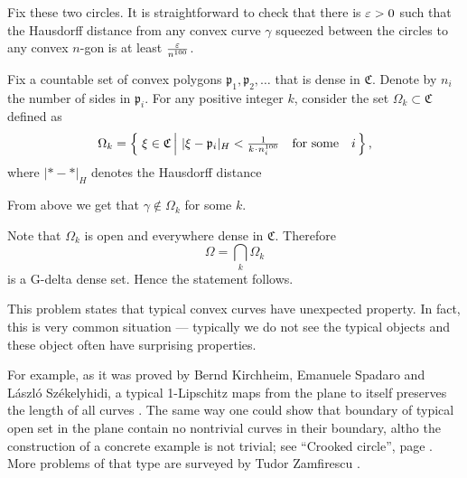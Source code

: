 Fix these two circles.
It is straightforward to check that there is $\varepsilon>0$ such that 
the Hausdorff distance from any convex curve $\gamma$ squeezed between the circles 
to any convex $n$-gon is at least $\frac{\varepsilon}{n^{100}}$.

Fix a countable set of convex polygons $\mathfrak{p}_1,\mathfrak{p}_2,\dots$ that is dense in $\mathfrak{C}$.
Denote by $n_i$ the number of sides in $\mathfrak{p}_i$.
For any positive integer $k$,
consider the set $\Omega_k\subset\mathfrak{C}$ defined as 
\[\Omega_k
=
\set{\xi\in \mathfrak{C}}{|\xi-\mathfrak{p}_i|_{H}<\tfrac1{k\cdot n_i^{100}}\quad\text{for some}\quad i},\]
where $|{*}-{*}|_H$ denotes the Hausdorff distance 

From above we get that $\gamma\notin\Omega_k$ for some $k$. 

Note that $\Omega_k$ is open and everywhere dense in $\mathfrak{C}$.
Therefore 
\[\Omega=\bigcap_k\Omega_k\]
is a G-delta dense set.
Hence the statement follows.\qeds

This problem states that typical convex curves have unexpected property.
In fact, this is very common situation --- typically we do not see the typical objects and these object often have surprising properties.

For example, as it was proved by
Bernd Kirchheim, 
Emanuele Spadaro 
and 
L{\'a}szl{\'o} Sz{\'e}kelyhidi,
a typical 1-Lipschitz maps from the plane to itself preserves the length of all curves \cite[see][]{KSS}.
The same way one could show that boundary of typical open set in the plane contain no nontrivial curves in their boundary, 
altho the construction of a concrete example is not trivial;
see ``Crooked circle'', page \pageref{Crooked circle}.
More problems of that type are surveyed by Tudor Zamfirescu \cite[see][]{zamfirescu}.







